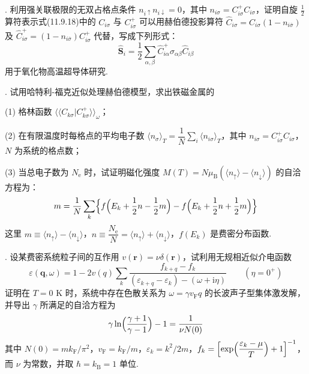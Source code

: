 {.} 利用强关联极限的无双占格点条件 $n_{i\uparrow}n_{i\downarrow}=0$，其中 $n_{i\sigma}=C^{+}_{i\sigma}C_{i\sigma}$，证明自旋 $\frac{1}{2}$ 算符表示式(11.9.18)中的 $C_{i\sigma}$ 与 $C^{+}_{i\sigma}$ 可以用赫伯德投影算符 $\hat{C}_{i\sigma}=C_{i\sigma}(1-n_{i\overline{\sigma}})$ 及 $\hat{C}^{+}_{i\sigma}=(1-n_{i\overline{\sigma}})C^{+}_{i\sigma}$ 代替，写成下列形式：
\begin{equation*}
  \hat{\boldsymbol{S}}_{i}=\frac{1}{2}\sum_{\alpha,\beta}
  \hat{C}^{+}_{i\alpha}\sigma_{\alpha\beta}\hat{C}_{i\beta}
\end{equation*}
用于氧化物高温超导体研究.

{.} 试用哈特利-福克近似处理赫伯德模型，求出铁磁金属的

(1) 格林函数 $\langle\langle C_{k\sigma}|C^{+}_{k\sigma}\rangle\rangle_{\omega}$；

(2) 在有限温度时每格点的平均电子数 $\langle n_{\sigma}\rangle_{T}=\dfrac{1}{N}\sum_{i}\langle n_{i\sigma}\rangle_{T}$，其中 $n_{i\sigma}=C^{+}_{i\sigma}C_{i\sigma}$，$N$ 为系统的格点数；

(3) 当总电子数为 $N_{\mathrm{e}}$ 时，试证明磁化强度 $M(T)=N\mu_{\mathrm{B}}\left(\langle n_{\uparrow}\rangle-\langle n_{\downarrow}\rangle\right)$ 的自洽方程为：
\begin{equation*}
  m=\frac{1}{N}\sum_{k}\Bigl\{f\Bigl(E_{k}+\frac{1}{2}n-\frac{1}{2}m\Bigr)
  -f\Bigl(E_{k}+\frac{1}{2}n+\frac{1}{2}m\Bigr)\Bigr\}
\end{equation*}
这里 $m\equiv\langle n_{\uparrow}\rangle-\langle n_{\downarrow}\rangle$，$n\equiv\dfrac{N_{\mathrm{e}}}{N}=\langle n_{\uparrow}\rangle+\langle n_{\downarrow}\rangle$，$f(E_{k})$ 是费密分布函数.

{.} 设某费密系统粒子间的互作用 $v(\boldsymbol{r})=\nu\delta(\boldsymbol{r})$，试利用无规相近似介电函数
\begin{equation*}
  \varepsilon(\boldsymbol{q},\omega)=1-2v(q)\sum_{k}
  \frac{f_{k+q}-f_{k}}{(\varepsilon_{k+q}-\varepsilon_{k})-(\omega+\mathrm{i}\eta)}
  \qquad\left(\eta=0^{+}\right)
\end{equation*}
证明在 $T=0$ K 时，系统中存在色散关系为 $\omega=\gamma v_{\mathrm{F}}q$ 的长波声子型集体激发解，并导出 $\gamma$ 所满足的自洽方程为
\begin{equation*}
  \gamma\ln\Bigl(\frac{\gamma+1}{\gamma-1}\Bigr)-1=\frac{1}{\nu N(0)}
\end{equation*}
其中 $N(0)=mk_{\mathrm{F}}/\pi^{2}$，$v_{\mathrm{F}}=k_{\mathrm{F}}/m$，$\varepsilon_{k}=k^{2}/2m$，$f_{k}=\Bigl[\exp\Bigl(\dfrac{\varepsilon_{k}-\mu}{T}\Bigr)+1\Bigr]^{-1}$，而 $\nu$ 为常数，并取 $\hbar=k_{\mathrm{B}}=1$ 单位.
